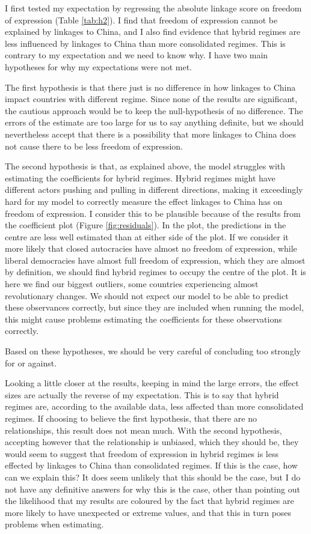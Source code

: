 I first tested my expectation by regressing the absolute linkage score on freedom of expression (Table \ref{tab:h2}). I find that freedom of expression cannot be explained by linkages to China, and I also find evidence that hybrid regimes are less influenced by linkages to China than more consolidated regimes. This is contrary to my expectation and we need to know why. I have two main hypotheses for why my expectations were not met.

The first hypothesis is that there just is no difference in how linkages to China impact countries with different regime. Since none of the results are significant, the cautious approach would be to keep the null-hypothesis of no difference. The errors of the estimate are too large for us to say anything definite, but we should nevertheless accept that there is a possibility that more linkages to China does not cause there to be less freedom of expression.

The second hypothesis is that, as explained above, the model struggles with estimating the coefficients for hybrid regimes. Hybrid regimes might have different actors pushing and pulling in different directions, making it exceedingly hard for my model to correctly measure the effect linkages to China has on freedom of expression. I consider this to be plausible because of the results from the coefficient plot (Figure \ref{fig:residuals}). In the plot, the predictions in the centre are less well estimated than at either side of the plot. If we consider it more likely that closed autocracies have almost no freedom of expression, while liberal democracies have almost full freedom of expression, which they are almost by definition, we should find hybrid regimes to occupy the centre of the plot. It is here we find our biggest outliers, some countries experiencing almost revolutionary changes. We should not expect our model to be able to predict these observances correctly, but since they are included when running the model, this might cause problems estimating the coefficients for these observations correctly. 

Based on these hypotheses, we should be very careful of concluding too strongly for or against.

Looking a little closer at the results, keeping in mind the large errors, the effect sizes are actually the reverse of my expectation. This is to say that hybrid regimes are, according to the available data, less affected than more consolidated regimes. If choosing to believe the first hypothesis, that there are no relationships, this result does not mean much. With the second hypothesis, accepting however that the relationship is unbiased, which they should be, they would seem to suggest that freedom of expression in hybrid regimes is less effected by linkages to China than consolidated regimes. If this is the case, how can we explain this? It does seem unlikely that this should be the case, but I do not have any definitive answers for why this is the case, other than pointing out the likelihood that my results are coloured by the fact that hybrid regimes are more likely to have unexpected or extreme values, and that this in turn poses problems when estimating.

